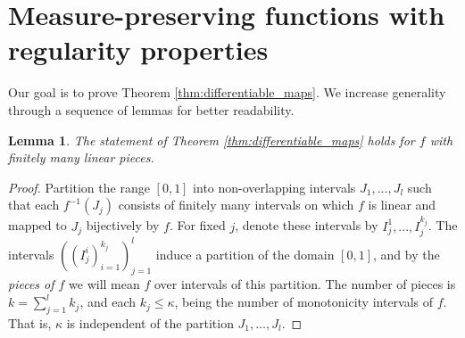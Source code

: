 \documentclass[11pt]{article}
\newtheorem{lemma}[theorem]{Lemma}
\theoremstyle{definition}
\begin{document}
\section{Measure-preserving functions with regularity properties} \label{sec:kolmogorov_sinai}

Our goal is to prove Theorem \ref{thm:differentiable_maps}. We increase generality through a sequence of lemmas for better readability.

\begin{lemma} \label{lemma:diff_maps_piecewise_lin}
    The statement of Theorem \ref{thm:differentiable_maps} holds for $f$ with finitely many linear pieces.
\end{lemma}

\begin{proof}
    Partition the range $[0,1]$ into non-overlapping intervals $J_1, ..., J_l$ such that each $f^{-1}(J_j)$ consists of finitely many intervals on which $f$ is linear and mapped to $J_j$ bijectively by $f$. For fixed $j$, denote these intervals by $I_j^{1}, ..., I_j^{k_j}$. The intervals $((I_j^i)_{i=1}^{k_j})_{j=1}^l$ induce a partition of the domain $[0, 1]$, and by the \textit{pieces of $f$} we will mean $f$ over intervals of this partition. The number of pieces is $k=\sum_{j=1}^{l}k_j$, and each $k_j\leq \kappa$, being the number of monotonicity intervals of $f$. That is, $\kappa$ is independent of the partition $J_1, \dots, J_l$.


\end{proof}
\end{document}
